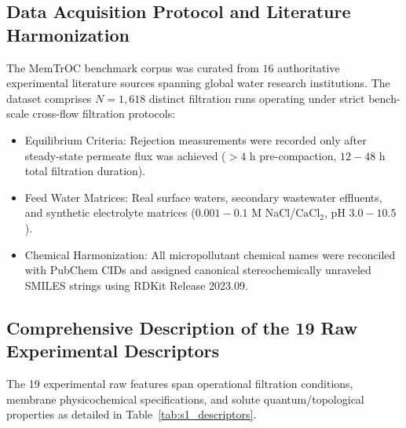 \documentclass[11pt]{article}
\begin{document}
\subsection{Data Acquisition Protocol and Literature Harmonization}
The MemTrOC benchmark corpus was curated from $16$ authoritative experimental literature sources spanning global water research institutions. The dataset comprises $N = 1{,}618$ distinct filtration runs operating under strict bench-scale cross-flow filtration protocols:
\begin{itemize}[leftmargin=0.8cm, topsep=2pt, itemsep=1pt, parsep=0pt]
    \item Equilibrium Criteria: Rejection measurements were recorded only after steady-state permeate flux was achieved ($>4\text{ h}$ pre-compaction, $12 - 48\text{ h}$ total filtration duration).
    \item Feed Water Matrices: Real surface waters, secondary wastewater effluents, and synthetic electrolyte matrices ($0.001 - 0.1\text{ M}$ NaCl/$\text{CaCl}_2$, $\text{pH } 3.0 - 10.5$).
    \item Chemical Harmonization: All micropollutant chemical names were reconciled with PubChem CIDs and assigned canonical stereochemically unraveled SMILES strings using RDKit Release 2023.09.
\end{itemize}

\subsection{Comprehensive Description of the 19 Raw Experimental Descriptors}
The 19 experimental raw features span operational filtration conditions, membrane physicochemical specifications, and solute quantum/topological properties as detailed in Table~\ref{tab:s1_descriptors}.
\end{document}
